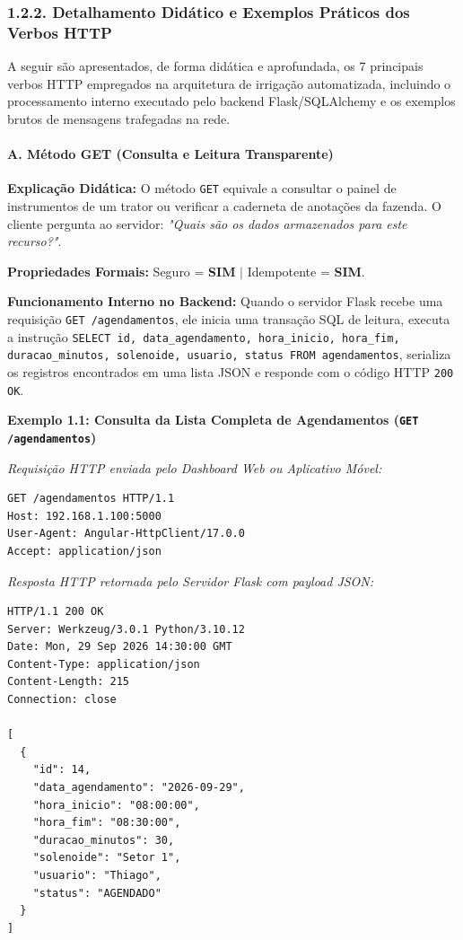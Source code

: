 \subsubsection*{1.2.2. Detalhamento Didático e Exemplos Práticos dos Verbos HTTP}

A seguir são apresentados, de forma didática e aprofundada, os 7 principais verbos HTTP empregados na arquitetura de irrigação automatizada, incluindo o processamento interno executado pelo backend Flask/SQLAlchemy e os exemplos brutos de mensagens trafegadas na rede.

\paragraph*{A. Método GET (Consulta e Leitura Transparente)}

\textbf{Explicação Didática:} O método \texttt{GET} equivale a consultar o painel de instrumentos de um trator ou verificar a caderneta de anotações da fazenda. O cliente pergunta ao servidor: \textit{"Quais são os dados armazenados para este recurso?"}.

\textbf{Propriedades Formais:} Seguro = \textbf{SIM} $|$ Idempotente = \textbf{SIM}.

\textbf{Funcionamento Interno no Backend:} Quando o servidor Flask recebe uma requisição \texttt{GET /agendamentos}, ele inicia uma transação SQL de leitura, executa a instrução \texttt{SELECT id, data\_agendamento, hora\_inicio, hora\_fim, duracao\_minutos, solenoide, usuario, status FROM agendamentos}, serializa os registros encontrados em uma lista JSON e responde com o código HTTP \texttt{200 OK}.

\textbf{Exemplo 1.1: Consulta da Lista Completa de Agendamentos (\texttt{GET /agendamentos})}

\textit{Requisição HTTP enviada pelo Dashboard Web ou Aplicativo Móvel:}
\begin{lstlisting}
GET /agendamentos HTTP/1.1
Host: 192.168.1.100:5000
User-Agent: Angular-HttpClient/17.0.0
Accept: application/json

\end{lstlisting}

\textit{Resposta HTTP retornada pelo Servidor Flask com payload JSON:}
\begin{lstlisting}
HTTP/1.1 200 OK
Server: Werkzeug/3.0.1 Python/3.10.12
Date: Mon, 29 Sep 2026 14:30:00 GMT
Content-Type: application/json
Content-Length: 215
Connection: close

[
  {
    "id": 14,
    "data_agendamento": "2026-09-29",
    "hora_inicio": "08:00:00",
    "hora_fim": "08:30:00",
    "duracao_minutos": 30,
    "solenoide": "Setor 1",
    "usuario": "Thiago",
    "status": "AGENDADO"
  }
]
\end{lstlisting}

